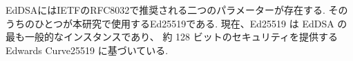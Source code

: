 EdDSAにはIETFのRFC8032で推奨される二つのパラメーターが存在する.
そのうちのひとつが本研究で使用するEd25519である.
現在、Ed25519 は EdDSA の最も一般的なインスタンスであり、
約 128 ビットのセキュリティを提供する Edwards Curve25519 
に基づいている.